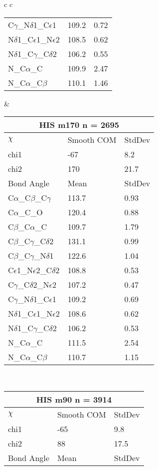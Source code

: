 \begin{longtable}{ c c }
\begin{tabular}{ l l l }
  C$\gamma$\_N$\delta$1\_C$\epsilon$1 & 109.2 & 0.72\\
  N$\delta$1\_C$\epsilon$1\_N$\epsilon$2 & 108.5 & 0.62\\
  N$\delta$1\_C$\gamma$\_C$\delta$2 & 106.2 & 0.55\\
  N\_C$\alpha$\_C & 109.9 & 2.47\\
  N\_C$\alpha$\_C$\beta$ & 110.1 & 1.46\\
  \bottomrule
  \end{tabular}
  &
  \begin{tabular}{ l l l }
  \toprule
  \multicolumn{3}{c}{HIS \textbf{m170} n = 2695} \\ \toprule
  $\chi$       & Smooth COM & StdDev \\ \midrule
  chi1 & -67 & 8.2 \\ 
  chi2 & 170 & 21.7 \\ \midrule
  Bond Angle   & Mean     & StdDev \\ \midrule
  C$\alpha$\_C$\beta$\_C$\gamma$ & 113.7 & 0.93\\
  C$\alpha$\_C\_O & 120.4 & 0.88\\
  C$\beta$\_C$\alpha$\_C & 109.7 & 1.79\\
  C$\beta$\_C$\gamma$\_C$\delta$2 & 131.1 & 0.99\\
  C$\beta$\_C$\gamma$\_N$\delta$1 & 122.6 & 1.04\\
  C$\epsilon$1\_N$\epsilon$2\_C$\delta$2 & 108.8 & 0.53\\
  C$\gamma$\_C$\delta$2\_N$\epsilon$2 & 107.2 & 0.47\\
  C$\gamma$\_N$\delta$1\_C$\epsilon$1 & 109.2 & 0.69\\
  N$\delta$1\_C$\epsilon$1\_N$\epsilon$2 & 108.6 & 0.62\\
  N$\delta$1\_C$\gamma$\_C$\delta$2 & 106.2 & 0.53\\
  N\_C$\alpha$\_C & 111.5 & 2.54\\
  N\_C$\alpha$\_C$\beta$ & 110.7 & 1.15\\
  \bottomrule
  \end{tabular}
  \\
  \begin{tabular}{ l l l }
  \toprule
  \multicolumn{3}{c}{HIS \textbf{m90} n = 3914} \\ \toprule
  $\chi$       & Smooth COM & StdDev \\ \midrule
  chi1 & -65 & 9.8 \\ 
  chi2 & 88 & 17.5 \\ \midrule
  Bond Angle   & Mean     & StdDev \\ \midrule

\end{tabular}
\end{longtable}
